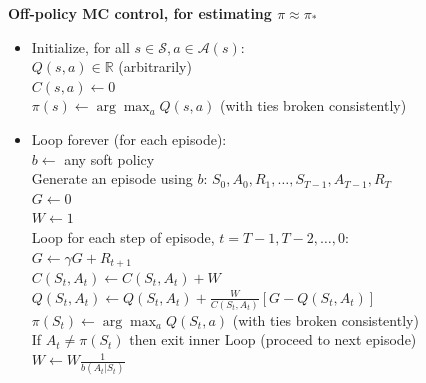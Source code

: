 \textbf{Off-policy MC control, for estimating $\pi \approx \pi_*$}
\begin{itemize}[leftmargin=*]
	\item[] Initialize, for all $s \in \mathcal{S}, a \in \mathcal{A}(s)$:\\
	      $Q(s, a) \in \mathbb{R}$ (arbitrarily)\\
	      $C(s, a) \leftarrow 0$\\
	      $\pi(s) \leftarrow \arg\max_a Q(s, a)$ \quad (with ties broken consistently) %

	\item[] Loop forever (for each episode):\\
	      $b \leftarrow$ any soft policy\\
	      Generate an episode using $b$: $S_0, A_0, R_1, \ldots, S_{T-1}, A_{T-1}, R_T$\\
	      $G \leftarrow 0$\\
	      $W \leftarrow 1$\\
	      Loop for each step of episode, $t = T-1, T-2, \ldots, 0$:\\
	      \hspace*{1em} $G \leftarrow \gamma G + R_{t+1}$\\
	      \hspace*{1em} $C(S_t, A_t) \leftarrow C(S_t, A_t) + W$\\
	      \hspace*{1em} $Q(S_t, A_t) \leftarrow Q(S_t, A_t) + \frac{W}{C(S_t, A_t)} [G - Q(S_t, A_t)]$\\
	      \hspace*{1em} $\pi(S_t) \leftarrow \arg\max_a Q(S_t, a)$ \quad (with ties broken consistently)\\
	      \hspace*{1em} If $A_t \neq \pi(S_t)$ then exit inner Loop (proceed to next episode)\\
	      \hspace*{1em} $W \leftarrow W \frac{1}{b(A_t|S_t)}$
\end{itemize}
